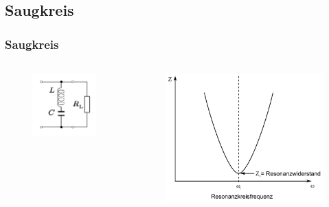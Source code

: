 \subsection*{Saugkreis}
\begin{frame}
  \frametitle{Saugkreis}
  \begin{columns}
    \begin{center}
      \begin{figure}
        \includegraphics[width=\textwidth,height=.5\textheight,keepaspectratio]{e07/Saugkreis.png}
      \end{figure}
    \end{center}
    \begin{center}
      \begin{figure}
        \includegraphics[width=\textwidth,height=.5\textheight,keepaspectratio]{e07/SerirenschwSig.png}

\end{figure}
\end{center}
\end{columns}
\end{frame}
